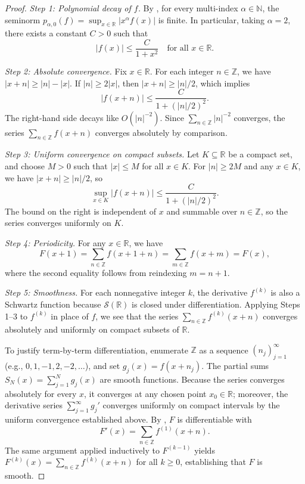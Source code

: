 \begin{proof}
\medskip
\noindent\textit{Step 1: Polynomial decay of $f$.} By , for every multi-index $\alpha \in \mathbb{N}$, the seminorm $p_{\alpha,0}(f) = \sup_{x \in \mathbb{R}} |x^\alpha f(x)|$ is finite. In particular, taking $\alpha = 2$, there exists a constant $C > 0$ such that
$$|f(x)| \leq \frac{C}{1 + x^2} \quad \text{for all } x \in \mathbb{R}.$$

\medskip
\noindent\textit{Step 2: Absolute convergence.} Fix $x \in \mathbb{R}$. For each integer $n \in \mathbb{Z}$, we have $|x + n| \geq |n| - |x|$. If $|n| \geq 2|x|$, then $|x+n| \geq |n|/2$, which implies
$$|f(x+n)| \leq \frac{C}{1 + (|n|/2)^2}.$$
The right-hand side decays like $O(|n|^{-2})$. Since $\sum_{n \in \mathbb{Z}} |n|^{-2}$ converges, the series $\sum_{n \in \mathbb{Z}} f(x+n)$ converges absolutely by comparison.

\medskip
\noindent\textit{Step 3: Uniform convergence on compact subsets.} Let $K \subseteq \mathbb{R}$ be a compact set, and choose $M > 0$ such that $|x| \leq M$ for all $x \in K$. For $|n| \geq 2M$ and any $x \in K$, we have $|x+n| \geq |n|/2$, so
$$\sup_{x \in K} |f(x+n)| \leq \frac{C}{1 + (|n|/2)^2}.$$
The bound on the right is independent of $x$ and summable over $n \in \mathbb{Z}$, so the series converges uniformly on $K$.

\medskip
\noindent\textit{Step 4: Periodicity.} For any $x \in \mathbb{R}$, we have
$$F(x+1) = \sum_{n \in \mathbb{Z}} f(x + 1 + n) = \sum_{m \in \mathbb{Z}} f(x + m) = F(x),$$
where the second equality follows from reindexing $m = n+1$.

\medskip
\noindent\textit{Step 5: Smoothness.} For each nonnegative integer $k$, the derivative $f^{(k)}$ is also a Schwartz function because $\mathcal{S}(\mathbb{R})$ is closed under differentiation. Applying Steps 1--3 to $f^{(k)}$ in place of $f$, we see that the series $\sum_{n \in \mathbb{Z}} f^{(k)}(x+n)$ converges absolutely and uniformly on compact subsets of $\mathbb{R}$.

To justify term-by-term differentiation, enumerate $\mathbb{Z}$ as a sequence $(n_j)_{j=1}^\infty$ (e.g., $0, 1, -1, 2, -2, \ldots$), and set $g_j(x) = f(x + n_j)$. The partial sums $S_N(x) = \sum_{j=1}^N g_j(x)$ are smooth functions. Because the series converges absolutely for every $x$, it converges at any chosen point $x_0 \in \mathbb{R}$; moreover, the derivative series $\sum_{j=1}^\infty g_j'$ converges uniformly on compact intervals by the uniform convergence established above. By , $F$ is differentiable with
$$F'(x) = \sum_{n \in \mathbb{Z}} f^{(1)}(x + n).$$
The same argument applied inductively to $F^{(k-1)}$ yields $F^{(k)}(x) = \sum_{n \in \mathbb{Z}} f^{(k)}(x+n)$ for all $k \geq 0$, establishing that $F$ is smooth.
\end{proof}

